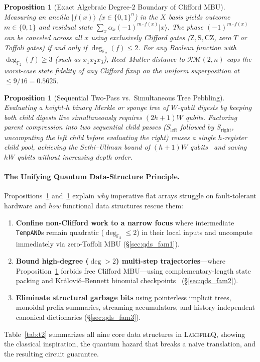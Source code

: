 \documentclass[acmsmall,screen,anonymous]{acmart}
\DeclareRobustCommand{\_}{\ifmmode\text{\char95}\else\char95\penalty0\relax\fi}
\theoremstyle{plain}
\newtheorem{proposition}[theorem]{Proposition}
\newcommand{\LakefillQ}{\textsc{LakefillQ}}
\begin{document}
\begin{proposition}[Exact Algebraic Degree-$2$ Boundary of Clifford MBU]
\label{prop:p1}
Measuring an ancilla $|f(x)\rangle$ ($x \in \{0,1\}^n$) in the $X$ basis yields outcome $m \in \{0,1\}$ and residual state $\sum_x \alpha_x (-1)^{m \cdot f(x)} |x\rangle$. The phase $(-1)^{m \cdot f(x)}$ can be canceled across all $x$ using exclusively Clifford gates ($\mathrm{Z}, \mathrm{S}, \mathrm{CZ}$, zero $T$ or Toffoli gates) \emph{if and only if} $\deg_{\mathbb{F}_2}(f) \le 2$. For any Boolean function with $\deg_{\mathbb{F}_2}(f) \ge 3$ (such as $x_1 x_2 x_3$), Reed--Muller distance to $\mathcal{RM}(2, n)$ caps the worst-case state fidelity of any Clifford fixup on the uniform superposition at $\le 9/16 = 0.5625$.
\end{proposition}

\begin{proposition}[Sequential Two-Pass vs.\ Simultaneous Tree Pebbling]
\label{prop:p2}
Evaluating a height-$h$ binary Merkle or sponge tree of $W$-qubit digests by keeping both child digests live simultaneously requires $(2h + 1)W$ qubits. Factoring parent compression into two sequential child passes ($S_{\mathrm{left}}$ followed by $S_{\mathrm{right}}$, uncomputing the left child before evaluating the right) reuses a single $h$-register child pool, achieving the Sethi--Ullman bound of $(h + 1)W$ qubits~\cite{sethi1970} and saving $h W$ qubits without increasing depth order.
\end{proposition}

\paragraph{The Unifying Quantum Data-Structure Principle.}
Propositions~\ref{prop:p1} and~\ref{prop:p2} explain \emph{why} imperative flat arrays struggle on fault-tolerant hardware and \emph{how} functional data structures rescue them:
\begin{enumerate}
  \item \textbf{Confine non-Clifford work to a narrow focus} where intermediate \texttt{TempAND}s remain quadratic ($\deg_{\mathbb{F}_2} \le 2$) in their local inputs and uncompute immediately via zero-Toffoli MBU (\S\ref{sec:qds_fam1}).
  \item \textbf{Bound high-degree ($\deg > 2$) multi-step trajectories}---where Proposition~\ref{prop:p1} forbids free Clifford MBU---using complementary-length state packing and Kr\'{a}lovi\v{c}--Bennett binomial checkpoints~\cite{bennett1989,kralovic2001} (\S\ref{sec:qds_fam2}).
  \item \textbf{Eliminate structural garbage bits} using pointerless implicit trees, monoidal prefix summaries, streaming accumulators, and history-independent canonical dictionaries (\S\ref{sec:qds_fam3}).
\end{enumerate}
Table~\ref{tab:t2} summarizes all nine core data structures in \LakefillQ{}, showing the classical inspiration, the quantum hazard that breaks a naive translation, and the resulting circuit guarantee.
\end{document}
